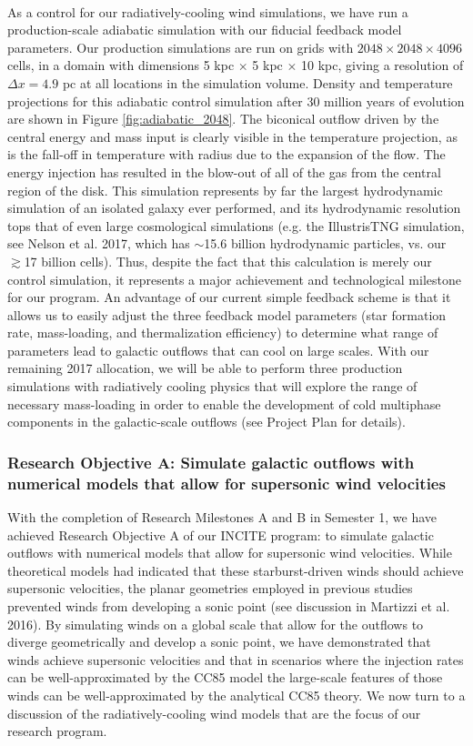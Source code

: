 \documentclass[11pt,letterpaper,english]{article}
\begin{document}
~\\
As a control for our radiatively-cooling wind simulations, we have run a production-scale adiabatic simulation with our fiducial feedback model parameters. Our production simulations are run on grids with $2048\times2048\times4096$ cells, in a domain with dimensions 5 kpc $\times$ 5 kpc $\times$ 10 kpc, giving a resolution of $\Delta x=4.9$ pc at all locations in the simulation volume. Density and temperature projections for this adiabatic control simulation after 30 million years of evolution are shown in Figure \ref{fig:adiabatic_2048}. The biconical outflow driven by the central energy and mass input is clearly visible in the temperature projection, as is the fall-off in temperature with radius due to the expansion of the flow. The energy injection has resulted in the blow-out of all of the gas from the central region of the disk. This simulation represents by far the largest hydrodynamic simulation of an isolated galaxy ever performed, and its hydrodynamic resolution tops that of even large cosmological simulations (e.g. the IllustrisTNG simulation, see Nelson et al. 2017, which has $\sim$15.6 billion hydrodynamic particles, vs. our $\gtrsim$17 billion cells). Thus, despite the fact that this calculation is merely our control simulation, it represents a major achievement and technological milestone for our program.
An advantage of our current simple feedback scheme is that it allows us to easily adjust the three feedback model parameters (star formation rate, mass-loading, and thermalization efficiency) to determine what range of parameters lead to galactic outflows that can cool on large scales. With our remaining 2017 allocation, we will be able to perform three production simulations with radiatively cooling physics that will explore the range of necessary mass-loading in order to enable the development of cold multiphase components in the
galactic-scale outflows (see Project Plan for details).

\subsubsection{Research Objective A: Simulate galactic outflows with numerical models that allow for supersonic wind velocities}

With the completion of Research Milestones A and B in Semester 1, we have achieved Research Objective A of our INCITE program: to simulate galactic outflows with numerical models that allow for supersonic wind velocities. While theoretical models had indicated that these starburst-driven winds should achieve supersonic velocities, the planar geometries employed in previous studies prevented winds from developing a sonic point (see discussion in Martizzi et al. 2016). By simulating winds on a global scale that allow
for the outflows to diverge geometrically and develop a sonic point, we have demonstrated that winds achieve supersonic velocities and that in scenarios where the injection rates can be well-approximated by the CC85 model the large-scale features of those winds can be well-approximated by the analytical CC85 theory. We now turn to a discussion of the radiatively-cooling wind models that are the focus of our research program.
\end{document}
